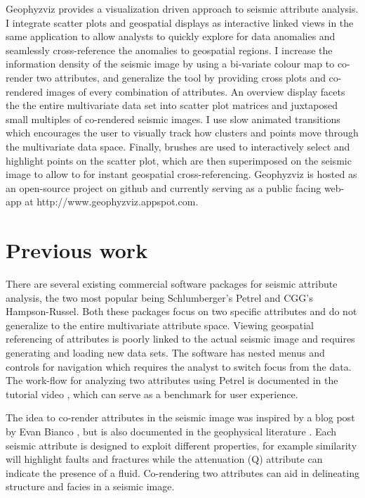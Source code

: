 \documentclass[journal]{vgtc}                %
\begin{document}
Geophyzviz provides a visualization driven approach to seismic attribute analysis. I integrate
scatter plots and geospatial displays as interactive linked views in the same application to allow
analysts to quickly explore for data anomalies and seamlessly cross-reference the anomalies to geospatial
regions. I increase the information density of the seismic image by using a bi-variate colour map to
co-render two attributes, and generalize the tool by providing cross plots and co-rendered images of
every combination of attributes. An overview display facets the the entire multivariate data set into
scatter plot matrices and juxtaposed small multiples of co-rendered seismic images. I use slow animated
transitions which encourages the user to visually track how clusters and points move through
the multivariate data space. Finally, brushes are used to interactively select and highlight
points on the scatter plot, which are then superimposed on the seismic image to allow to for
instant geospatial cross-referencing. Geophyzviz is hosted as an open-source project on github
and currently serving as a public facing web-app at http://www.geophyzviz.appspot.com.



\section{Previous work}


There are several existing commercial software packages for seismic attribute analysis, the
two most popular being Schlumberger's Petrel and CGG's Hampson-Russel. Both these packages
focus on two specific attributes and do not generalize to the entire multivariate attribute space.
Viewing geospatial referencing of attributes is poorly linked to the actual seismic image and requires
generating and loading new data sets. The software has nested menus and controls for navigation
which requires the analyst to switch focus from the data. The work-flow for analyzing two attributes
using Petrel is documented in the tutorial video \cite{petrel-vid}, which can serve as a benchmark for user experience.

The idea to co-render attributes in the seismic image was inspired by a blog post by Evan Bianco \cite{bianco-2015}, but is
also documented in the geophysical literature \cite{chopra-attr}. Each seismic attribute is designed to exploit different
properties, for example similarity will highlight faults and fractures while the attenuation (Q) attribute
can indicate the presence of a fluid. Co-rendering two attributes can aid in delineating structure and facies
in a seismic image.
\end{document}
